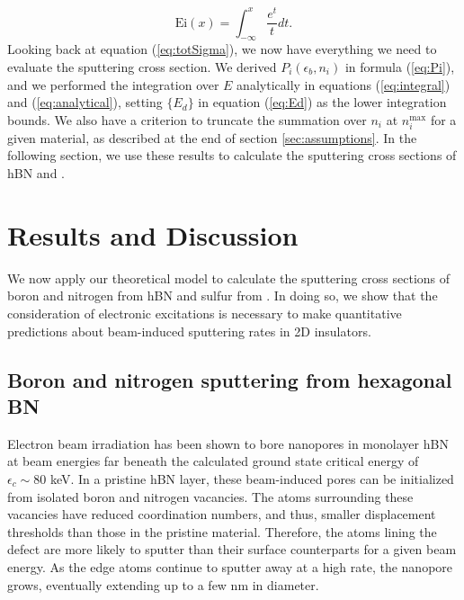 \documentclass[twoside,twocolumn,9pt]{article}
\begin{document}
\begin{equation}
  \text{Ei}(x) = \int_{-\infty}^x \frac{e^t}{t}dt.
  \label{eq:Ei}
\end{equation}
%
Looking back at equation (\ref{eq:totSigma}), we now have everything we need to
evaluate the sputtering cross section.
We derived $P_i(\epsilon_b, n_i)$ in formula (\ref{eq:Pi}), and we performed
the integration over $E$ analytically in equations (\ref{eq:integral}) and
(\ref{eq:analytical}), setting $\{E_d\}$ in equation (\ref{eq:Ed}) as the lower
integration bounds.
We also have a criterion to truncate the summation over $n_i$ at
$n_i^\text{max}$ for a given material, as described at the end of section
\ref{sec:assumptions}.
In the following section, we use these results to calculate the sputtering
cross sections of hBN and .

\section{Results and Discussion}
\label{sec:results}

We now apply our theoretical model to calculate the sputtering cross sections
of boron and nitrogen from hBN and sulfur from .
In doing so, we show that the consideration of electronic excitations is
necessary to make quantitative predictions about beam-induced sputtering rates
in 2D insulators.

\subsection{Boron and nitrogen sputtering from hexagonal BN}
\label{sec:hBN}

Electron beam irradiation has been shown to bore nanopores in monolayer hBN at
beam energies far beneath the calculated ground state critical energy of
$\epsilon_c\sim80$ keV.\cite{Jin2009,Meyer2009,Kotakoski2010,Cretu2015}
In a pristine hBN layer, these beam-induced pores can be initialized from
isolated boron and nitrogen vacancies.
The atoms surrounding these vacancies have reduced coordination numbers, and
thus, smaller displacement thresholds than those in the pristine material.
Therefore, the atoms lining the defect are more likely to sputter than their
surface counterparts for a given beam energy.
As the edge atoms continue to sputter away at a high rate, the nanopore grows,
eventually extending up to a few nm in diameter.
\cite{Meyer2009,Cretu2015,Dogan2020}
\end{document}
